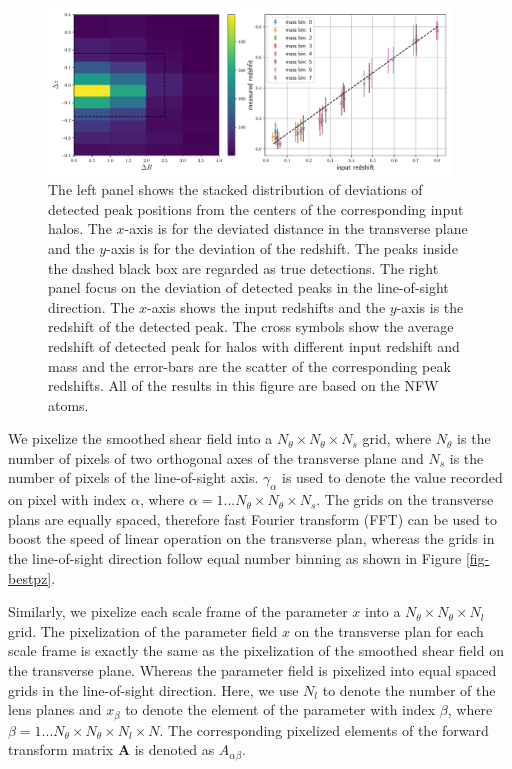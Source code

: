 \documentclass[twocolumn]{aastex62}
\begin{document}
\begin{figure}[!t]
 \centering
 \includegraphics[width=0.95\textwidth]{peak_scatters_f3-1.pdf}
 \caption{The left panel shows the stacked distribution of deviations of detected peak positions 
 from the centers of the corresponding input halos. The $x$-axis is for the deviated distance in the transverse plane and the 
 $y$-axis is for the deviation of the redshift. The peaks inside the dashed black box are regarded as true detections. The 
 right panel focus on the deviation of detected peaks in the line-of-sight direction. The $x$-axis shows the input redshifts 
 and the $y$-axis is the redshift of the detected peak. The cross symbols show the average redshift of detected peak for 
 halos with different input redshift and mass and the error-bars are the scatter of the corresponding peak redshifts. All 
 of the results in this figure are based on the NFW atoms.}
\end{figure}

We pixelize the smoothed shear field into a $N_\theta \times N_\theta \times N_s$ grid, where $N_\theta$
is the number of pixels of two orthogonal axes of the transverse plane and $N_s$ is the number of pixels of the
line-of-sight axis. $\gamma_{\alpha}$ is used to denote the value recorded on pixel with index $\alpha$, where $\alpha=
1...N_\theta \times N_\theta \times N_s$. The grids on the transverse plans are equally spaced, therefore fast Fourier
transform (FFT) can be used to boost the speed of linear operation on the transverse plan, whereas the grids in the 
line-of-sight direction follow equal number binning as shown in Figure \ref{fig-bestpz}.

Similarly, we pixelize each scale frame of the parameter $x$ into a $N_\theta \times N_\theta \times N_l$ grid. 
The pixelization of the parameter field $x$ on the transverse plan for each scale frame is exactly the same as the 
pixelization of the smoothed shear field on the transverse plane. Whereas the parameter field is pixelized into equal 
spaced grids in the line-of-sight direction. Here, we use $N_l$ to denote the number of the lens planes and $x_{\beta}$ to 
denote the element of the parameter with index $\beta$, where $\beta=1...N_\theta \times N_\theta \times N_l \times N$. 
The corresponding pixelized elements of the forward transform matrix $\mathbf{A}$ is denoted as $A_{\alpha\beta}$.
\end{document}
